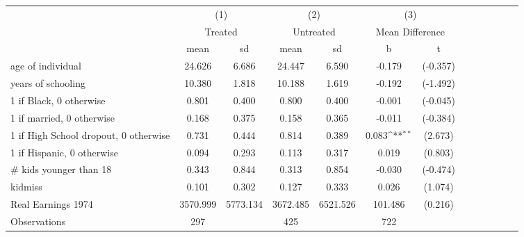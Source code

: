 {
\def\sym#1{\ifmmode^{#1}\else\(^{#1}\)\fi}
\begin{tabular}{l*{3}{cccc}}
\hline\hline
                    &\multicolumn{2}{c}{(1)}  &\multicolumn{2}{c}{(2)}  &\multicolumn{2}{c}{(3)}           \\
                    &\multicolumn{2}{c}{Treated}&\multicolumn{2}{c}{Untreated}&\multicolumn{2}{c}{Mean Difference}\\
                    &        mean&          sd&        mean&          sd&           b         &           t\\
\hline
age of individual   &      24.626&       6.686&      24.447&       6.590&      -0.179         &    (-0.357)\\
years of schooling  &      10.380&       1.818&      10.188&       1.619&      -0.192         &    (-1.492)\\
1 if Black, 0 otherwise&       0.801&       0.400&       0.800&       0.400&      -0.001         &    (-0.045)\\
1 if married, 0 otherwise&       0.168&       0.375&       0.158&       0.365&      -0.011         &    (-0.384)\\
1 if High School dropout, 0 otherwise&       0.731&       0.444&       0.814&       0.389&       0.083\sym{**} &     (2.673)\\
1 if Hispanic, 0 otherwise&       0.094&       0.293&       0.113&       0.317&       0.019         &     (0.803)\\
# kids younger than 18&       0.343&       0.844&       0.313&       0.854&      -0.030         &    (-0.474)\\
kidmiss             &       0.101&       0.302&       0.127&       0.333&       0.026         &     (1.074)\\
Real Earnings 1974  &    3570.999&    5773.134&    3672.485&    6521.526&     101.486         &     (0.216)\\
\hline
Observations        &         297&            &         425&            &         722         &            \\
\hline\hline
\end{tabular}
}
